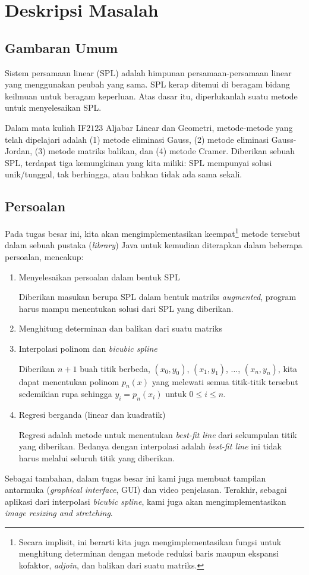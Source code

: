 \section{Deskripsi Masalah}
\subsection{Gambaran Umum}
Sistem persamaan linear (SPL) adalah himpunan persamaan-persamaan linear yang menggunakan peubah yang sama. SPL kerap ditemui di beragam bidang keilmuan untuk beragam keperluan. Atas dasar itu, diperlukanlah suatu metode untuk menyelesaikan SPL. 

Dalam mata kuliah IF$2123$ Aljabar Linear dan Geometri, metode-metode yang telah dipelajari adalah (1) metode eliminasi Gauss, (2) metode eliminasi Gauss-Jordan, (3) metode matriks balikan, dan (4) metode Cramer. Diberikan sebuah SPL, terdapat tiga kemungkinan yang kita miliki: SPL mempunyai solusi unik/tunggal, tak berhingga, atau bahkan tidak ada sama sekali.

\subsection{Persoalan}
\par Pada tugas besar ini, kita akan mengimplementasikan keempat\footnote{Secara implisit, ini berarti kita juga mengimplementasikan fungsi untuk menghitung determinan dengan metode reduksi baris maupun ekspansi kofaktor, \textit{adjoin}, dan balikan dari suatu matriks.} metode tersebut dalam sebuah pustaka (\textit{library}) Java untuk kemudian diterapkan dalam beberapa persoalan, mencakup:
\begin{enumerate}
    \item Menyelesaikan persoalan dalam bentuk SPL
    
    Diberikan masukan berupa SPL dalam bentuk matriks \textit{augmented}, program harus mampu menentukan solusi dari SPL yang diberikan.
    
    \item Menghitung determinan dan balikan dari suatu matriks
    \item Interpolasi polinom dan \textit{bicubic spline}
    
    Diberikan $n+1$ buah titik berbeda, $(x_0, y_0)$, $(x_1, y_1)$, $\ldots$, $(x_n, y_n)$, kita dapat menentukan polinom $p_n(x)$ yang melewati semua titik-titik tersebut sedemikian rupa sehingga $y_i = p_n(x_i)$ untuk $0 \leq i \leq n$.

    \item Regresi berganda (linear dan kuadratik)
    
    Regresi adalah metode untuk menentukan \textit{best-fit line} dari sekumpulan titik yang diberikan. Bedanya dengan interpolasi adalah \textit{best-fit line} ini tidak harus melalui seluruh titik yang diberikan.
\end{enumerate}

    Sebagai tambahan, dalam tugas besar ini kami juga membuat tampilan antarmuka (\textit{graphical interface}, GUI) dan video penjelasan. Terakhir, sebagai aplikasi dari interpolasi \textit{bicubic spline}, kami juga akan mengimplementasikan \textit{image resizing and stretching}.

\pagebreak